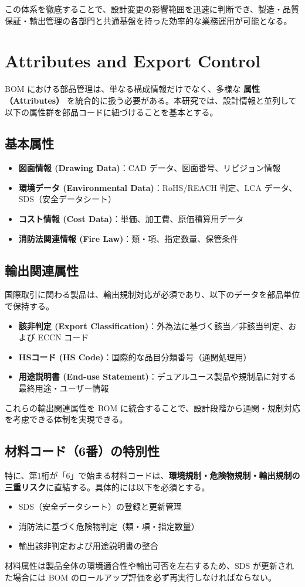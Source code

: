 \documentclass[10pt,conference]{IEEEtran}
\begin{document}
この体系を徹底することで、設計変更の影響範囲を迅速に判断でき、製造・品質保証・輸出管理の各部門と共通基盤を持った効率的な業務運用が可能となる。

\section{Attributes and Export Control}
BOM における部品管理は、単なる構成情報だけでなく、多様な \textbf{属性（Attributes）} を統合的に扱う必要がある。本研究では、設計情報と並列して以下の属性群を部品コードに紐づけることを基本とする。

\subsection{基本属性}
\begin{itemize}
  \item \textbf{図面情報 (Drawing Data)}：CAD データ、図面番号、リビジョン情報
  \item \textbf{環境データ (Environmental Data)}：RoHS/REACH 判定、LCA データ、SDS（安全データシート）
  \item \textbf{コスト情報 (Cost Data)}：単価、加工費、原価積算用データ
  \item \textbf{消防法関連情報 (Fire Law)}：類・項、指定数量、保管条件
\end{itemize}

\subsection{輸出関連属性}
国際取引に関わる製品は、輸出規制対応が必須であり、以下のデータを部品単位で保持する。
\begin{itemize}
  \item \textbf{該非判定 (Export Classification)}：外為法に基づく該当／非該当判定、および ECCN コード
  \item \textbf{HSコード (HS Code)}：国際的な品目分類番号（通関処理用）
  \item \textbf{用途説明書 (End-use Statement)}：デュアルユース製品や規制品に対する最終用途・ユーザー情報
\end{itemize}

これらの輸出関連属性を BOM に統合することで、設計段階から通関・規制対応を考慮できる体制を実現できる。

\subsection{材料コード（6番）の特別性}
特に、第1桁が「6」で始まる材料コードは、\textbf{環境規制・危険物規制・輸出規制の三重リスク}に直結する。具体的には以下を必須とする。
\begin{itemize}
  \item SDS（安全データシート）の登録と更新管理
  \item 消防法に基づく危険物判定（類・項・指定数量）
  \item 輸出該非判定および用途説明書の整合
\end{itemize}
材料属性は製品全体の環境適合性や輸出可否を左右するため、SDS が更新された場合には BOM のロールアップ評価を必ず再実行しなければならない。
\end{document}
